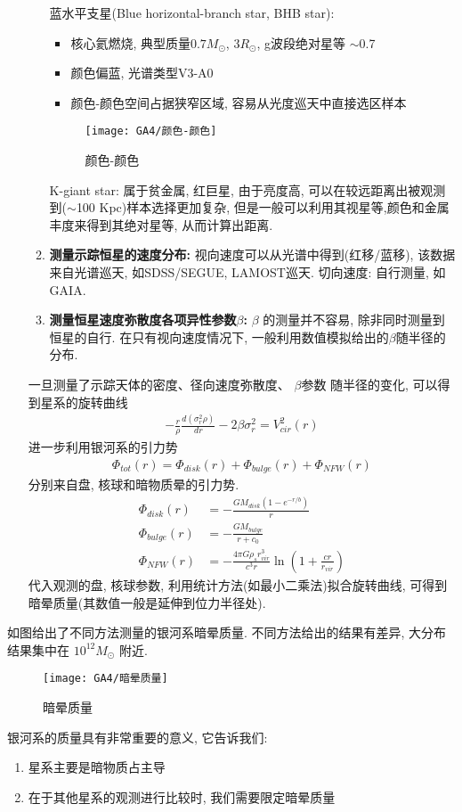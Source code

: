 \begin{enumerate}
\begin{enumerate}
        \subitem 蓝水平支星(Blue horizontal-branch star, BHB star): 
        \begin{itemize}\small
            \item 核心氦燃烧, 典型质量$0.7M_{\odot}$, $3R_{\odot}$, g波段绝对星等 $\sim$0.7
            \item 颜色偏蓝, 光谱类型V3-A0
            \item 颜色-颜色空间占据狭窄区域, 容易从光度巡天中直接选区样本
        \end{itemize}
        \begin{figure}[!htb]
            \centering
            \texttt{[image: GA4/颜色-颜色]}
            \caption{颜色-颜色}
        \end{figure}
        \subitem K-giant star: 属于贫金属, 红巨星, 由于亮度高, 可以在较远距离出被观测到($\sim$100 Kpc)样本选择更加复杂, 但是一般可以利用其视星等,颜色和金属丰度来得到其绝对星等, 从而计算出距离.   
        \item \textbf{测量示踪恒星的速度分布: }
        \subitem 视向速度可以从光谱中得到(红移/蓝移), 该数据来自光谱巡天, 如SDSS/SEGUE, LAMOST巡天. 
        \subitem 切向速度: 自行测量, 如GAIA. 
        \item \textbf{测量恒星速度弥散度各项异性参数$\beta$: }$\beta$ 的测量并不容易, 除非同时测量到恒星的自行. 在只有视向速度情况下, 一般利用数值模拟给出的$\beta$随半径的分布. 
    \end{enumerate}
    一旦测量了示踪天体的密度、径向速度弥散度、 $\beta$参数 随半径的变化, 可以得到星系的旋转曲线
    \begin{align*}
        -\frac{r}{\rho}\frac{d(\sigma_r^2\rho)}{dr}-2\beta\sigma_r^2=V_{cir}^2(r)
    \end{align*}
    进一步利用银河系的引力势
    \begin{align*}
        \Phi_{tot}(r)=\Phi_{disk}(r)+\Phi_{bulge}(r)+\Phi_{NFW}(r)
    \end{align*}
    分别来自盘, 核球和暗物质晕的引力势. 
    \begin{align*}
        \Phi_{disk}(r)&= -\frac{GM_{disk}(1-e^{-r/b})}{r}\\ 
        \Phi_{bulge}(r)&= -\frac{GM_{bulge}}{r+c_0}\\
        \Phi_{NFW}(r)&=-\frac{4\pi G\rho_s r_{vir}^3}{c^3 r}\ln \left( 1+\frac{cr}{r_{vir}} \right)
    \end{align*}
    代入观测的盘, 核球参数, 利用统计方法(如最小二乘法)拟合旋转曲线, 可得到暗晕质量(其数值一般是延伸到位力半径处). 
\end{enumerate}

如图给出了不同方法测量的银河系暗晕质量. 不同方法给出的结果有差异, 大分布结果集中在 $10^{12}M_{\odot}$ 附近. 
\begin{figure}[!htb]
    \centering
    \texttt{[image: GA4/暗晕质量]}
    \caption{暗晕质量}
\end{figure}

银河系的质量具有非常重要的意义, 它告诉我们: 
\begin{enumerate}
    \item 星系主要是暗物质占主导
    \item 在于其他星系的观测进行比较时, 我们需要限定暗晕质量
\end{enumerate}

